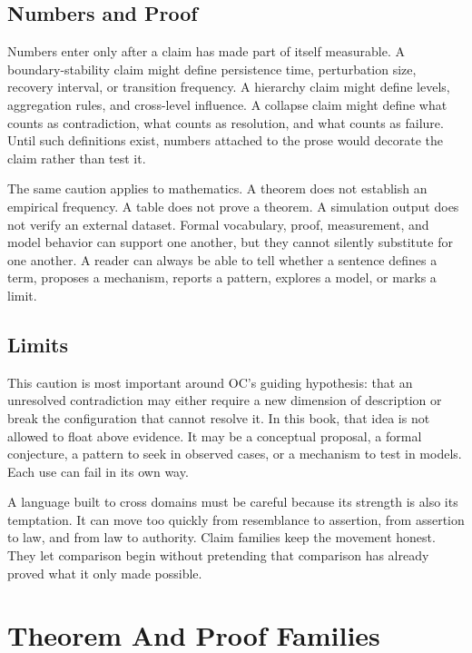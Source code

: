 \documentclass[11pt,a4paper,openany]{book}
\begin{document}
\subsection{Numbers and Proof}
Numbers enter only after a claim has made part of itself measurable. A boundary-stability claim might define persistence time, perturbation size, recovery interval, or transition frequency. A hierarchy claim might define levels, aggregation rules, and cross-level influence. A collapse claim might define what counts as contradiction, what counts as resolution, and what counts as failure. Until such definitions exist, numbers attached to the prose would decorate the claim rather than test it. \cite{grimmett_percolation,goldenfeld_lectures}\par
The same caution applies to mathematics. A theorem does not establish an empirical frequency. A table does not prove a theorem. A simulation output does not verify an external dataset. Formal vocabulary, proof, measurement, and model behavior can support one another, but they cannot silently substitute for one another. A reader can always be able to tell whether a sentence defines a term, proposes a mechanism, reports a pattern, explores a model, or marks a limit.\par
\subsection{Limits}
This caution is most important around OC's guiding hypothesis: that an unresolved contradiction may either require a new dimension of description or break the configuration that cannot resolve it. In this book, that idea is not allowed to float above evidence. It may be a conceptual proposal, a formal conjecture, a pattern to seek in observed cases, or a mechanism to test in models. Each use can fail in its own way. \cite{grimmett_percolation,goldenfeld_lectures}\par
A language built to cross domains must be careful because its strength is also its temptation. It can move too quickly from resemblance to assertion, from assertion to law, and from law to authority. Claim families keep the movement honest. They let comparison begin without pretending that comparison has already proved what it only made possible.\par
\section{Theorem And Proof Families}
\end{document}
